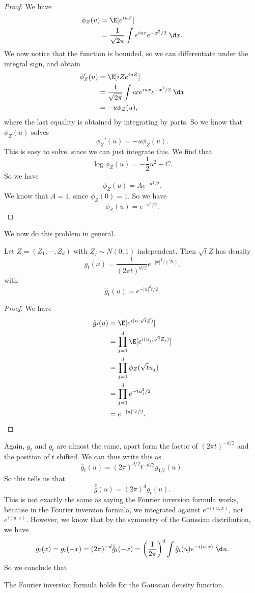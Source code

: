 \documentclass[a4paper]{article}
\begin{document}
\begin{proof}
  We have
  \begin{align*}
    \phi_Z(u) &= \E[e^{iuZ}]\\
    &= \frac{1}{\sqrt{2\pi}} \int e^{iux} e^{-x^2/2}\;\d x.
  \end{align*}
  We now notice that the function is bounded, so we can differentiate under the integral sign, and obtain
  \begin{align*}
    \phi_Z'(u) &= \E[iZ e^{iuZ}]\\
    &= \frac{1}{\sqrt{2\pi}} \int ix e^{iux} e^{-x^2/2}\;\d x\\
    &= - u\phi_Z(u),
  \end{align*}
  where the last equality is obtained by integrating by parts. So we know that $\phi_Z(u)$ solves
  \[
    \phi_Z'(u) = -u \phi_Z(u).
  \]
  This is easy to solve, since we can just integrate this. We find that
  \[
    \log \phi_Z(u) = - \frac{1}{2}u^2 + C.
  \]
  So we have
  \[
    \phi_Z(u) = A e^{-u^2/2}.
  \]
  We know that $A = 1$, since $\phi_Z(0) = 1$. So we have
  \[
    \phi_Z(u) = e^{-u^2/2}.
  \]
\end{proof}

We now do this problem in general.
\begin{prop}
  Let $Z = (Z_1, \cdots, Z_d)$ with $Z_j \sim N(0, 1)$ independent. Then $\sqrt{t} Z$ has density
  \[
    g_t(x) = \frac{1}{(2\pi t)^{d/2}} e^{-|x|^2/(2t)}.
  \]
  with
  \[
    \hat{g}_t(u) = e^{-|u|^2 t/2}.
  \]
\end{prop}

\begin{proof}
  We have
  \begin{align*}
    \hat{g}_t(u) &= \E[e^{i(u, \sqrt{t}Z)}]\\
    &= \prod_{j = 1}^d \E[e^{i(u_j, \sqrt{t} Z_j)}]\\
    &= \prod_{j = 1}^d \phi_Z(\sqrt{t} u_j)\\
    &= \prod_{j = 1}^d e^{-t u_j^2/2}\\
    &= e^{-|u|^2 t/2}.
  \end{align*}
\end{proof}
Again, $g_t$ and $\hat{g}_t$ are almost the same, apart form the factor of $(2\pi t)^{-d/2}$ and the position of $t$ shifted. We can thus write this as
\[
  \hat{g}_t(u) = (2\pi)^{d/2} t^{-d/2} g_{1/t} (u).
\]
So this tells us that
\[
  \hat{\hat{g}}(u) = (2\pi)^d g_t(u).
\]
This is not exactly the same as saying the Fourier inversion formula works, because in the Fourier inversion formula, we integrated against $e^{-i(u, x)}$, not $e^{i(u, x)}$. However, we know that by the symmetry of the Gaussian distribution, we have
\[
  g_t(x) = g_t(-x) = (2\pi)^{-d} \hat{\hat{g}}_t (-x) = \left(\frac{1}{2\pi}\right)^d \int \hat{g}_t(u) e^{-i(u, x)}\;\d u.
\]
So we conclude that
\begin{lemma}
  The Fourier inversion formula holds for the Gaussian density function.
\end{lemma}
\end{document}
